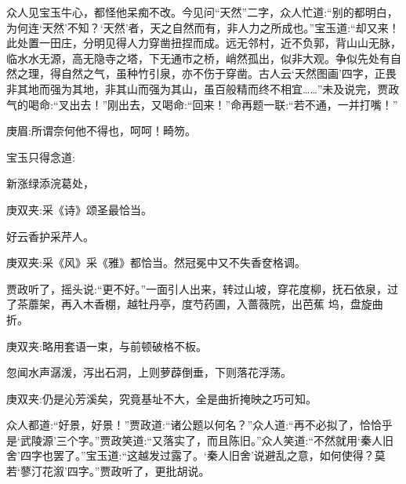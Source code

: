 \begin{parag}
    众人见宝玉牛心，都怪他呆痴不改。今见问“天然”二字，众人忙道:“别的都明白，为何连‘天然’不知？‘天然’者，天之自然而有，非人力之所成也。”宝玉道:“却又来！此处置一田庄，分明见得人力穿凿扭捏而成。远无邻村，近不负郭，背山山无脉，临水水无源，高无隐寺之塔，下无通市之桥，峭然孤出，似非大观。争似先处有自然之理，得自然之气，虽种竹引泉，亦不伤于穿凿。古人云‘天然图画’四字，正畏非其地而强为其地，非其山而强为其山，虽百般精而终不相宜……”未及说完，贾政气的喝命:“叉出去！”刚出去，又喝命:“回来！”命再题一联:“若不通，一并打嘴！”\begin{note}庚眉:所谓奈何他不得也，呵呵！畸笏。\end{note}宝玉只得念道:
\end{parag}


\begin{poem}
    \begin{pl} 新涨绿添浣葛处，\end{pl}
    \begin{note}庚双夹:采《诗》颂圣最恰当。\end{note}

    \begin{pl} 好云香护采芹人。\end{pl}
    \begin{note}庚双夹:采《风》采《雅》都恰当。然冠冕中又不失香奁格调。\end{note}
\end{poem}


\begin{parag}
    贾政听了，摇头说:“更不好。”一面引人出来，转过山坡，穿花度柳，抚石依泉，过了茶蘼架，再入木香棚，越牡丹亭，度芍药圃，入蔷薇院，出芭蕉 坞，盘旋曲折。\begin{note}庚双夹:略用套语一束，与前顿破格不板。\end{note}忽闻水声潺湲，泻出石洞，上则萝薜倒垂，下则落花浮荡。\begin{note}庚双夹:仍是沁芳溪矣，究竟基址不大，全是曲折掩映之巧可知。\end{note}众人都道:“好景，好景！”贾政道:“诸公题以何名？”众人道:“再不必拟了，恰恰乎是‘武陵源’三个字。”贾政笑道:“又落实了，而且陈旧。”众人笑道:“不然就用‘秦人旧舍’四字也罢了。”宝玉道:“这越发过露了。‘秦人旧舍’说避乱之意，如何使得？莫若‘蓼汀花溆’四字。”贾政听了，更批胡说。
\end{parag}


